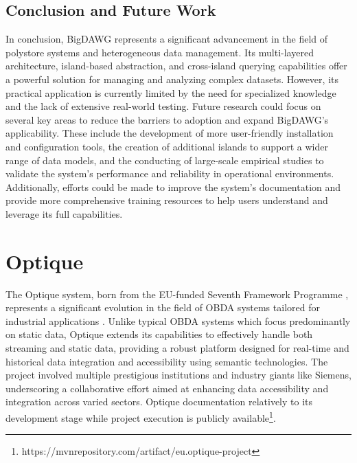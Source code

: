 \subsection{Conclusion and Future Work}
In conclusion, \ac{BigDAWG} represents a significant advancement in the field of polystore systems and heterogeneous data management. Its multi-layered architecture, island-based abstraction, and cross-island querying capabilities offer a powerful solution for managing and analyzing complex datasets. However, its practical application is currently limited by the need for specialized knowledge and the lack of extensive real-world testing.
Future research could focus on several key areas to reduce the barriers to adoption and expand \ac{BigDAWG}'s applicability. These include the development of more user-friendly installation and configuration tools, the creation of additional islands to support a wider range of data models, and the conducting of large-scale empirical studies to validate the system's performance and reliability in operational environments. Additionally, efforts could be made to improve the system's documentation and provide more comprehensive training resources to help users understand and leverage its full capabilities.

\section{Optique}
The Optique system, born from the EU-funded Seventh Framework Programme \cite{DBLP:journals/ijtm/LytrasSP09}, represents a significant evolution in the field of \ac{OBDA} systems tailored for industrial applications \cite{DBLP:conf/semweb/KharlamovBGJLNO15}. Unlike typical OBDA systems which focus predominantly on static data, Optique extends its capabilities to effectively handle both streaming and static data, providing a robust platform designed for real-time and historical data integration and accessibility using semantic technologies. The project involved multiple prestigious institutions and industry giants like Siemens, underscoring a collaborative effort aimed at enhancing data accessibility and integration across varied sectors. Optique documentation relatively to its development stage while project execution is publicly available\footnote{https://mvnrepository.com/artifact/eu.optique-project}.
